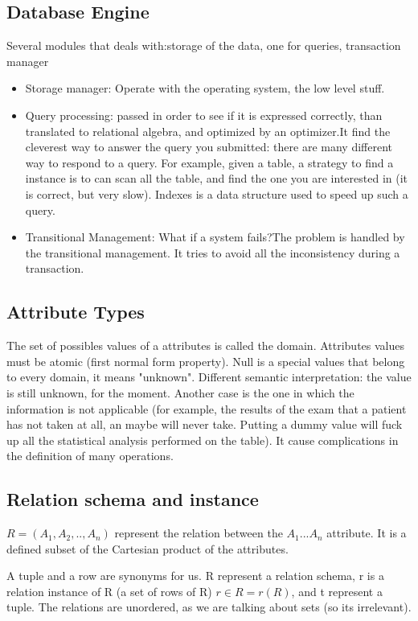 \documentclass[11pt]{report}
\theoremstyle{definition}
\theoremstyle{remark}
\begin{document}
\subsection*{Database Engine}
Several modules that deals with:storage of the data, one for queries, transaction manager 
\begin{itemize}
    \item Storage manager: Operate with the operating system, the low level stuff.
    \item Query processing: passed in order to see if it is expressed correctly, than translated to relational algebra, and optimized by an optimizer.It find the cleverest way to answer the query you submitted: there are many different way to respond to a query. For example, given a table, a strategy to find a instance is to can scan all the table, and find the one you are interested in (it is correct, but very slow). Indexes is a data structure used to speed up such a query. 
    \item Transitional Management: What if a system fails?The problem is handled by the transitional management. It tries to avoid all the inconsistency during a transaction.
\end{itemize}

\subsection*{Attribute Types}
The set of possibles values of a attributes is called the domain. 
Attributes values must be atomic (first normal form property). 
Null is a special values that belong to every domain, it means "unknown". Different semantic interpretation: the value is still unknown, for the moment.
Another case is the one in which the information is not applicable (for example, the results of the exam that a patient has not taken at all, an maybe will never take. Putting a dummy value will fuck up all the statistical analysis performed on the table).
It cause complications in the definition of many operations. 

\subsection*{Relation schema and instance}
$R=(A_1,A_2,..,A_n)$ represent the relation between the $A_1...A_n$ attribute. It is a defined subset of the Cartesian product of the attributes. 

A tuple and a row are synonyms for us. R represent a relation schema, r is a relation instance of R (a set of rows of R) $ r \in R = r(R)$, and t represent a tuple.
The relations are unordered, as we are talking about sets (so its irrelevant).
\end{document}
